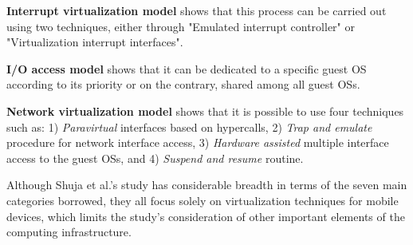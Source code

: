 	\textbf{Interrupt virtualization model} shows that this process can be carried out using two techniques, either through "Emulated interrupt controller" or "Virtualization interrupt interfaces".

	\textbf{I/O access model} shows that it can be dedicated to a specific guest OS according to its priority or on the contrary, shared among all guest OSs. 

	\textbf{Network virtualization model} shows that it is possible to use four techniques such as: 1) \textit{Paravirtual} interfaces based on hypercalls, 2) \textit{Trap and emulate} procedure for network interface access, 3) \textit{Hardware assisted} multiple interface access to the guest OSs, and 4) \textit{Suspend and resume} routine. 
	
	Although Shuja et al.'s study \cite{Shuja2016} has considerable breadth in terms of the seven main categories borrowed, they all focus solely on virtualization techniques for mobile devices, which limits the study's consideration of other important elements of the computing infrastructure.
	
	
	
	
	
	
	
	
	
	
	
	
	
	
